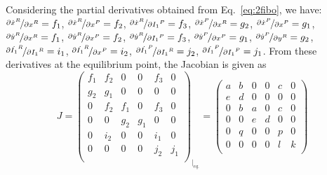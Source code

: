 \documentclass[12pt]{article}
\begin{document}
Considering the partial derivatives obtained from 
Eq.~\ref{eq:2fibo}, we have:
$\nicefrac{\partial \dot{x}^R}{\partial {x}^R} = f_1$,
$\nicefrac{\partial \dot{x}^R}{\partial {x}^P} = f_2$,
$\nicefrac{\partial \dot{x}^R}{\partial {I_1}^P} = f_3$,
$\nicefrac{\partial \dot{x}^P}{\partial {x}^R} = g_2$,
$\nicefrac{\partial \dot{x}^P}{\partial {x}^P} = g_1$,
$\nicefrac{\partial \dot{y}^R}{\partial {x}^R} = f_1$,
$\nicefrac{\partial \dot{y}^R}{\partial {x}^P} = f_2$,
$\nicefrac{\partial \dot{y}^R}{\partial {I_1}^P} = f_3$,
$\nicefrac{\partial \dot{y}^P}{\partial {x}^P} = g_1$,
$\nicefrac{\partial \dot{y}^P}{\partial {y}^R} = g_2$,
$\nicefrac{\partial \dot{I_1}^R}{\partial {I_1}^R} = i_1$,
$\nicefrac{\partial \dot{I_1}^R}{\partial {x}^P} = i_2$,
$\nicefrac{\partial \dot{I_1}^P}{\partial {I_1}^R} = j_2$,
$\nicefrac{\partial \dot{I_1}^P}{\partial {I_1}^P} = j_1$.
From these derivatives at the equilibrium point, the 
Jacobian is given as
\begin{equation}
    J = \begin{pmatrix}
        f_1 & f_2 & 0 & 0 & f_3 & 0\\
        g_2 & g_1 & 0 & 0 & 0 & 0\\
        0 & f_2 & f_1 & 0 & f_3 & 0\\
        0 & 0 & g_2 & g_1 & 0 & 0\\
        0 & i_2 & 0 & 0 & i_1 & 0\\
        0 & 0 & 0 & 0 & j_2 & j_1\\
    \end{pmatrix}_{\big|_{eq.}} = 
    \begin{pmatrix}
        a & b & 0 & 0 & c & 0\\
        e & d & 0 & 0 & 0 & 0\\
        0 & b & a & 0 & c & 0\\
        0 & 0 & e & d & 0 & 0\\
        0 & q & 0 & 0 & p & 0\\
        0 & 0 & 0 & 0 & l & k\\
    \end{pmatrix}
\end{equation}
\end{document}
